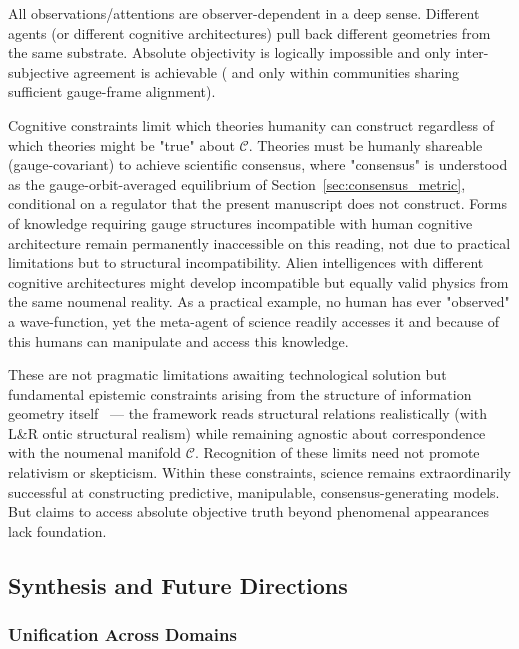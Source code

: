 \documentclass[11pt]{article}
\begin{document}
All observations/attentions are observer-dependent in a deep sense. Different agents (or different cognitive architectures) pull back different geometries from the same substrate. Absolute objectivity is logically impossible and only inter-subjective agreement is achievable ( and only within communities sharing sufficient gauge-frame alignment).

Cognitive constraints limit which theories humanity can construct regardless of which theories might be "true" about $\mathcal{C}$. Theories must be humanly shareable (gauge-covariant) to achieve scientific consensus, where "consensus" is understood as the gauge-orbit-averaged equilibrium of Section~\ref{sec:consensus_metric}, conditional on a regulator that the present manuscript does not construct. Forms of knowledge requiring gauge structures incompatible with human cognitive architecture remain permanently inaccessible on this reading, not due to practical limitations but to structural incompatibility. Alien intelligences with different cognitive architectures might develop incompatible but equally valid physics from the same noumenal reality.  As a practical example, no human has ever "observed" a wave-function, yet the meta-agent of science readily accesses it and because of this humans can manipulate and access this knowledge.

These are not pragmatic limitations awaiting technological solution but fundamental epistemic constraints arising from the structure of information geometry itself~\cite{Ladyman2007} — the framework reads structural relations realistically (with L\&R ontic structural realism) while remaining agnostic about correspondence with the noumenal manifold $\mathcal{C}$. Recognition of these limits need not promote relativism or skepticism. Within these constraints, science remains extraordinarily successful at constructing predictive, manipulable, consensus-generating models. But claims to access absolute objective truth beyond phenomenal appearances lack foundation.

\subsection{Synthesis and Future Directions}

\subsubsection{Unification Across Domains}
\end{document}
